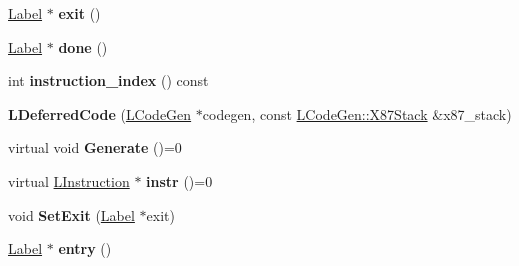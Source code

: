 \begin{DoxyCompactItemize}
\item 
\hyperlink{classv8_1_1internal_1_1_label}{Label} $\ast$ {\bfseries exit} ()\hypertarget{classv8_1_1internal_1_1_l_deferred_code_a6043e3196286cb6f4e9d4fa7a02a8d45}{}\label{classv8_1_1internal_1_1_l_deferred_code_a6043e3196286cb6f4e9d4fa7a02a8d45}

\item 
\hyperlink{classv8_1_1internal_1_1_label}{Label} $\ast$ {\bfseries done} ()\hypertarget{classv8_1_1internal_1_1_l_deferred_code_ac35e7348bb33faf300bb395d631a9881}{}\label{classv8_1_1internal_1_1_l_deferred_code_ac35e7348bb33faf300bb395d631a9881}

\item 
int {\bfseries instruction\+\_\+index} () const \hypertarget{classv8_1_1internal_1_1_l_deferred_code_aba6ac1bc88b74cfadc577abda20b924d}{}\label{classv8_1_1internal_1_1_l_deferred_code_aba6ac1bc88b74cfadc577abda20b924d}

\item 
{\bfseries L\+Deferred\+Code} (\hyperlink{classv8_1_1internal_1_1_l_code_gen}{L\+Code\+Gen} $\ast$codegen, const \hyperlink{classv8_1_1internal_1_1_l_code_gen_1_1_x87_stack}{L\+Code\+Gen\+::\+X87\+Stack} \&x87\+\_\+stack)\hypertarget{classv8_1_1internal_1_1_l_deferred_code_a1052a459e95d3275f51d993a578eb676}{}\label{classv8_1_1internal_1_1_l_deferred_code_a1052a459e95d3275f51d993a578eb676}

\item 
virtual void {\bfseries Generate} ()=0\hypertarget{classv8_1_1internal_1_1_l_deferred_code_a3ecee53bcc5ac23471eb4feab825aef6}{}\label{classv8_1_1internal_1_1_l_deferred_code_a3ecee53bcc5ac23471eb4feab825aef6}

\item 
virtual \hyperlink{classv8_1_1internal_1_1_l_instruction}{L\+Instruction} $\ast$ {\bfseries instr} ()=0\hypertarget{classv8_1_1internal_1_1_l_deferred_code_a88f155d9618545e8ddcade46dbe326dd}{}\label{classv8_1_1internal_1_1_l_deferred_code_a88f155d9618545e8ddcade46dbe326dd}

\item 
void {\bfseries Set\+Exit} (\hyperlink{classv8_1_1internal_1_1_label}{Label} $\ast$exit)\hypertarget{classv8_1_1internal_1_1_l_deferred_code_a8725fbf78aeb5b880fc1fbbf340b8278}{}\label{classv8_1_1internal_1_1_l_deferred_code_a8725fbf78aeb5b880fc1fbbf340b8278}

\item 
\hyperlink{classv8_1_1internal_1_1_label}{Label} $\ast$ {\bfseries entry} ()\hypertarget{classv8_1_1internal_1_1_l_deferred_code_a5383c3a5dab780bc5b5aee66a7cff46c}{}\label{classv8_1_1internal_1_1_l_deferred_code_a5383c3a5dab780bc5b5aee66a7cff46c}


\end{DoxyCompactItemize}
